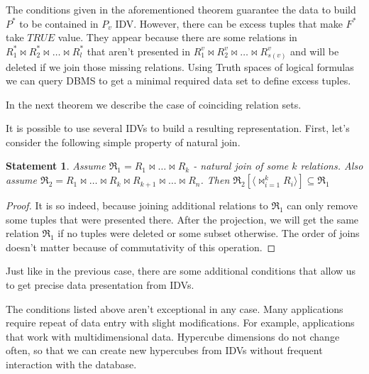 \documentclass[preprint,12pt]{elsarticle}
\newtheorem{statement}{Statement}
\def \n #1{\mathit{#1}}
\begin{document}


The conditions given in the aforementioned theorem guarantee the data to build
$P^{\ast}$ to be contained in $P_v$ IDV. However, there can be excess tuples that
make $F^{\ast}$
take $\n{TRUE}$ value. They appear because there are some relations in
$R^{\ast}_1 \Join R^{\ast}_2\Join \dots \Join R^{\ast}_l $ that aren't
presented in $R^v_1 \Join R^v_2 \Join \dots \Join R^v_{s(v)} $ and will be
deleted if we join those missing relations. Using Truth spaces of logical
formulas we can query DBMS to get a minimal required data set to define excess
tuples.

In the next theorem we describe the case of coinciding relation sets.



It is possible to use several IDVs to build a resulting representation. First,
let's consider the following simple property of natural join.

\begin{statement}
Assume $\Re_1 = R_1 \Join \dots \Join R_k$ - natural join of some $k$ relations.
Also assume $\Re_2 = R_1 \Join \dots \Join R_k \Join R_{k+1} \Join \dots \Join
R_{n}$. Then $\Re_2 [\langle \Join_{i=1}^{k} R_i \rangle] \subseteq \Re_1$
\label{join_property}
\end{statement}
\begin{proof}
It is so indeed, because joining additional relations to $\Re_1$ can only
remove some tuples that were presented there. After the projection, we will get
the same relation $\Re_1$ if no tuples were deleted or some subset otherwise. The
order of joins doesn't matter because of commutativity of this operation.
\end{proof}



Just like in the previous case, there are some additional conditions that allow
us to get precise data presentation from IDVs.



The conditions listed above aren't exceptional in any case. Many applications
require repeat of data entry with slight modifications. For example,
applications that
work with multidimensional data. Hypercube dimensions do not change often, so
that we can create new hypercubes from IDVs without frequent interaction with
the database. 
\end{document}
